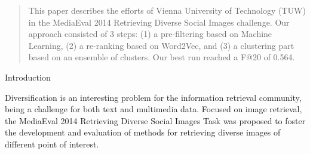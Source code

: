 \documentclass{acm_proc_article-me}
\begin{document}
\begin{abstract}
This paper describes the efforts of Vienna University of Technology (TUW) in the MediaEval 2014 Retrieving Diverse Social Images challenge.
Our approach consisted of 3 steps: (1) a pre-filtering based on Machine Learning, (2) a re-ranking based on Word2Vec, and (3) a clustering part based on an ensemble of clusters. 
Our best run reached a F@20 of 0.564. 

\end{abstract}

\begin{section}{Introduction}

Diversification is an interesting problem for the information retrieval community, 
being a challenge for both text and multimedia data.
Focused on image retrieval, the MediaEval 2014 Retrieving Diverse Social Images Task \cite{overview14}
was proposed to foster the development and evaluation of methods for retrieving 
diverse images of different point of interest.



\end{section}

\end{document}
